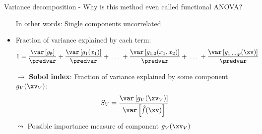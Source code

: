 \documentclass[11pt,compress,t,notes=noshow, aspectratio=169, xcolor=table]{beamer}
\newcommand{\open}{}
\newcommand{\close}{}
\begin{document}
\begin{frame}{Variance decomposition - Why is this method even called functional ANOVA?}
\begin{itemize}[<+->]
In other words: Single components uncorrelated


\item Fraction of variance explained by each term:
\begin{align*}
1 &= \frac{\var\left[g_{\open \emptyset \close}\right]}{\predvar} + \frac{\var\left[g_{\open 1 \close}(x_1)\right]}{\predvar} + %
\;\dots\;
+ \frac{\var\left[g_{\open 1, 2 \close}(x_1, x_2)\right]}{\predvar} + \;\dots\; + \frac{\var\left[g_{\open 1,\ldots,p \close}(\xv)\right]}{\predvar}
\end{align*}

\item[$\rightarrow$] \textbf{Sobol index}: Fraction of variance explained by some component $g_{\open V \close}(\xv_V)$:
$$
S_V = \frac{\var\left[g_{\open V \close}(\xv_V)\right]}{\var\left[\hat{f}(\xv)\right]}
$$
$\leadsto$ Possible importance measure of component $g_{\open V \close}(\xv_V)$\\
\end{itemize}

\end{frame}











\endlecture
\end{document}
